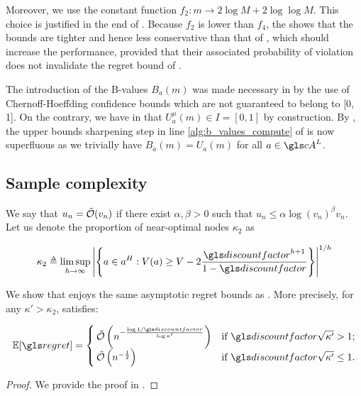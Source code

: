 Moreover, we use the constant function $f_2: m \rightarrow 2 \log M + 2 \log\log M$. This choice is justified in the end of . Because $f_2$ is lower than $f_4$, the  shows that the bounds are tighter and hence less conservative than that of \OLOP, which should increase the performance, provided that their associated probability of violation does not invalidate the regret bound of \OLOP.


\begin{remark}
	\label{rmk:sharpen}
	\begin{leftbar}[remarkbar]
	The introduction of the B-values $B_a(m)$ was made necessary in \OLOP by the use of Chernoff-Hoeffding confidence bounds which are not guaranteed to belong to [0, 1]. On the contrary, we have in \KLOLOP that $U^\mu_a(m) \in I = [0,1]$ by construction. By , the upper bounds sharpening step in line \ref{alg:b_values_compute} of  is now superfluous as we trivially have $B_a(m) = U_a(m)$ for all $a\in \cA^L$.
	\end{leftbar}
\end{remark}

\subsection{Sample complexity}
\label{sec:sample-complexity}

We say that $u_n = \tilde{\mathcal{O}}(v_n)$ if there exist $\alpha, \beta >0$ such that $u_n \leq \alpha \log(v_n)^\beta v_n$.
Let us denote the proportion of near-optimal nodes $\kappa_2$ as


\begin{equation*}
\label{eq:kappa}
\kappa_2 \eqdef \limsup_{h\rightarrow\infty}{\left|\left\{a\in a^H:V(a) \geq V - 2\frac{\discount^{h+1}}{1-\discount}\right\}\right|^{1/h}}
\end{equation*}

\begin{theorem}
	\label{thm:regret-kl-olop}
	\begin{leftbar}[theorembar]
	We show that \KLOLOP enjoys the same asymptotic regret bounds as \OLOP. More precisely, for any $\kappa' > \kappa_2$, \KLOLOP satisfies:
	
	
	\begin{equation*}
	\expectedvalue [\regret] = \begin{cases}
	\tilde{\cO}\left(n^{-\frac{\log 1/\discount}{\log \kappa'}}\right) & \text{if}\ \discount\sqrt{\kappa'} > 1; \\
	\tilde{\cO}\left(n^{-\frac{1}{2}}\right) & \text{if}\ \discount\sqrt{\kappa'} \leq 1.
	\end{cases}
	\end{equation*}
	\end{leftbar}
\end{theorem}
\begin{proof}
	We provide the proof in .
\end{proof}

